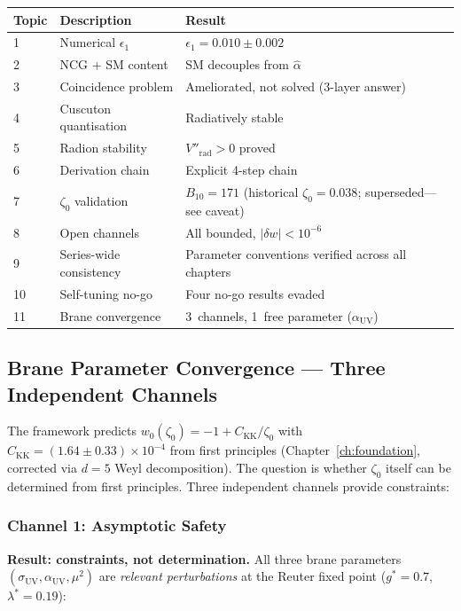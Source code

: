 \begin{center}
\begin{tabular}{l l l}
\hline
Topic & Description & Result \\
\hline
1 & Numerical $\epsilon_1$ & $\epsilon_1 = 0.010 \pm 0.002$ \\
2 & NCG + SM content & SM decouples from $\hat{\alpha}$ \\
3 & Coincidence problem & Ameliorated, not solved (3-layer answer) \\
4 & Cuscuton quantisation & Radiatively stable \\
5 & Radion stability & $V''_{\mathrm{rad}} > 0$ proved \\
6 & Derivation chain & Explicit 4-step chain \\
7 & $\zeta_0$ validation & $B_{10} = 171$ (historical $\zeta_0 = 0.038$; superseded---see caveat) \\
8 & Open channels & All bounded, $|\delta w| < 10^{-6}$ \\
9 & Series-wide consistency & Parameter conventions verified across all chapters \\
10 & Self-tuning no-go & Four no-go results evaded \\
11 & Brane convergence & 3~channels, 1~free parameter ($\alpha_{\mathrm{UV}}$) \\
\hline
\end{tabular}
\end{center}

\subsection{Brane Parameter Convergence --- Three Independent Channels}
\label{app:brane-convergence}

The framework predicts $w_0(\zeta_0) = -1 + C_\mathrm{KK}/\zeta_0$ with $C_\mathrm{KK} = (1.64 \pm 0.33) \times 10^{-4}$ from first principles (Chapter~\ref{ch:foundation}, corrected via $d = 5$ Weyl decomposition). The question is whether $\zeta_0$ itself can be determined from first principles. Three independent channels provide constraints:

\subsubsection{Channel 1: Asymptotic Safety}

\textbf{Result: constraints, not determination.} All three brane parameters $(\sigma_{\mathrm{UV}}, \alpha_{\mathrm{UV}}, \mu^2)$ are \emph{relevant perturbations} at the Reuter fixed point ($g^* = 0.7$, $\lambda^* = 0.19$):

